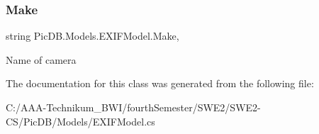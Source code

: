 \subsubsection{\texorpdfstring{Make}{Make}}
{\footnotesize\ttfamily string Pic\+D\+B.\+Models.\+E\+X\+I\+F\+Model.\+Make\hspace{0.3cm}{\ttfamily [get]}, {\ttfamily [set]}}



Name of camera 



The documentation for this class was generated from the following file\+:\begin{DoxyCompactItemize}
\item 
C\+:/\+A\+A\+A-\/\+Technikum\+\_\+\+B\+W\+I/fourth\+Semester/\+S\+W\+E2/\+S\+W\+E2-\/\+C\+S/\+Pic\+D\+B/\+Models/E\+X\+I\+F\+Model.\+cs\end{DoxyCompactItemize}
